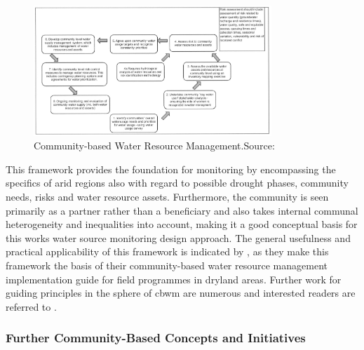 \begin{figure}[!hbp]
    \centering
    \includegraphics[width=0.8\textwidth]{figures/2023_MA_th_day_iwrm.jpg}
    \decoRule
    \caption[Community-based Water Resource Management]{Community-based Water Resource Management.\newline Source: \textcite{dayCommunitybasedWaterResources2009}}
    \label{fig:th_day_iwrm}
\end{figure}

This framework provides the foundation for monitoring by encompassing the specifics of arid regions also with regard to possible drought phases, community needs, risks and water resource assets. Furthermore, the community is seen primarily as a partner rather than a beneficiary and also takes internal communal heterogeneity and inequalities into account, making it a good conceptual basis for this works water source monitoring design approach. The general usefulness and practical applicability of this framework is indicated by \autocite{oxfamIntroductionCommunityBasedWater2009}, as they make this framework the basis of their community-based water resource management implementation guide for field programmes in dryland areas. Further work for guiding principles in the sphere of \acrshort{cbwm} are numerous and interested readers are referred to \autocite{westonCommunityBasedWaterMonitoring2015}.

\subsubsection*{Further Community-Based Concepts and Initiatives}\label{subsec:cbc}

